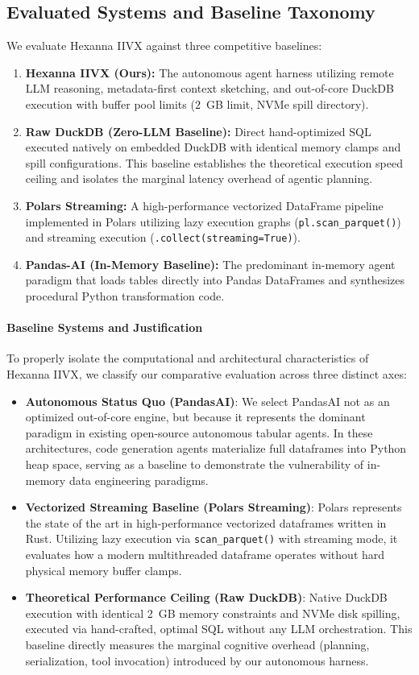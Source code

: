 \subsection{Evaluated Systems and Baseline Taxonomy}
We evaluate Hexanna IIVX against three competitive baselines:
\begin{enumerate}
    \item \textbf{Hexanna IIVX (Ours):} The autonomous agent harness utilizing remote LLM reasoning, metadata-first context sketching, and out-of-core DuckDB execution with buffer pool limits ($2$~GB limit, NVMe spill directory).
    \item \textbf{Raw DuckDB (Zero-LLM Baseline):} Direct hand-optimized SQL executed natively on embedded DuckDB \cite{raasveldt2023duckdb} with identical memory clamps and spill configurations. This baseline establishes the theoretical execution speed ceiling and isolates the marginal latency overhead of agentic planning.
    \item \textbf{Polars Streaming:} A high-performance vectorized DataFrame pipeline implemented in Polars \cite{polars2024} utilizing lazy execution graphs (\texttt{pl.scan\_parquet()}) and streaming execution (\texttt{.collect(streaming=True)}).
    \item \textbf{Pandas-AI (In-Memory Baseline):} The predominant in-memory agent paradigm \cite{pandas2023} that loads tables directly into Pandas DataFrames and synthesizes procedural Python transformation code.
\end{enumerate}

\paragraph{Baseline Systems and Justification}
To properly isolate the computational and architectural characteristics of Hexanna IIVX, we classify our comparative evaluation across three distinct axes:
\begin{itemize}
    \item \textbf{Autonomous Status Quo (PandasAI)}: We select PandasAI not as an optimized out-of-core engine, but because it represents the dominant paradigm in existing open-source autonomous tabular agents. In these architectures, code generation agents materialize full dataframes into Python heap space, serving as a baseline to demonstrate the vulnerability of in-memory data engineering paradigms.
    \item \textbf{Vectorized Streaming Baseline (Polars Streaming)}: Polars represents the state of the art in high-performance vectorized dataframes written in Rust. Utilizing lazy execution via \texttt{scan\_parquet()} with streaming mode, it evaluates how a modern multithreaded dataframe operates without hard physical memory buffer clamps.
    \item \textbf{Theoretical Performance Ceiling (Raw DuckDB)}: Native DuckDB execution with identical 2~GB memory constraints and NVMe disk spilling, executed via hand-crafted, optimal SQL without any LLM orchestration. This baseline directly measures the marginal cognitive overhead (planning, serialization, tool invocation) introduced by our autonomous harness.
\end{itemize}

